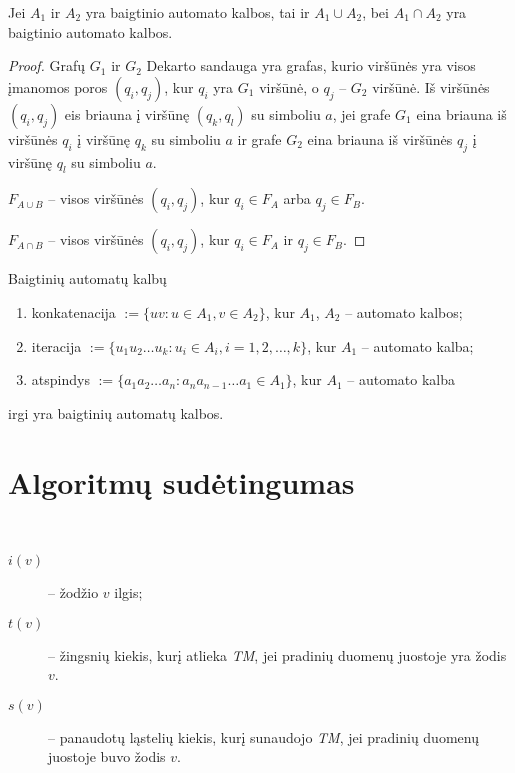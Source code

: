 \begin{prop}
  Jei $A_1$ ir $A_2$ yra baigtinio automato kalbos, tai ir 
  $A_1 \cup A_2$, bei $A_1 \cap A_2$ yra baigtinio automato kalbos.

  \begin{proof}
    Grafų $G_1$ ir $G_2$ Dekarto sandauga yra grafas, kurio viršūnės yra 
    visos įmanomos poros $(q_i,q_j)$, kur $q_i$ yra $G_1$ viršūnė, o 
    $q_j$ – $G_2$ viršūnė. Iš viršūnės $(q_i,q_j)$ eis briauna į 
    viršūnę $(q_k,q_l)$ su simboliu $a$, jei grafe $G_1$ eina briauna iš
    viršūnės $q_i$ į viršūnę $q_k$ su simboliu $a$ ir grafe $G_2$ eina
    briauna iš viršūnės $q_j$ į viršūnę $q_l$ su simboliu $a$.
    
    $F_{A \cup B}$ – visos viršūnės $(q_i,q_j)$, kur $q_i \in F_{A}$
    arba $q_j \in F_{B}$.

    $F_{A \cap B}$ – visos viršūnės $(q_i,q_j)$, kur $q_i \in F_{A}$
    ir $q_j \in F_{B}$.
  \end{proof}
\end{prop}

\begin{prop}
  Baigtinių automatų kalbų
  \begin{enumerate}
    \item konkatenacija $:= \{ uv : u \in A_1, v \in A_2 \}$, kur 
      $A_1$, $A_2$ – automato kalbos;
    \item iteracija $:=\{u_1 u_2 \dots u_k : u_i \in A_i, i=1,2,\dotsc,k\}$,
      kur $A_1$ – automato kalba;
    \item atspindys $:=\{a_1 a_2 \dots a_n : a_n a_{n-1} \dots a_1 %
      \in A_1 \}$, kur $A_1$ – automato kalba
  \end{enumerate}
    irgi yra baigtinių automatų kalbos.
\end{prop}

\section{Algoritmų sudėtingumas}

\begin{notation}
  \hfill \\
  \begin{description}
    \item[$i(v)$] – žodžio $v$ ilgis;
    \item[$t(v)$] – žingsnių kiekis, kurį atlieka \emph{TM}, jei 
      pradinių duomenų juostoje yra žodis $v$.
    \item[$s(v)$] – panaudotų ląstelių kiekis, kurį sunaudojo \emph{TM},
      jei pradinių duomenų juostoje buvo žodis $v$.
  \end{description}
\end{notation}

